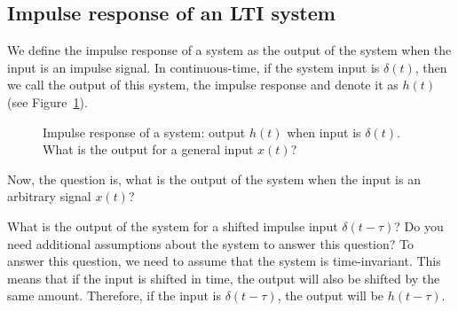 \documentclass{ee102_notes}
\begin{document}
\subsection{Impulse response of an LTI system}
We define the impulse response of a system as the output of the system when the input is an impulse signal. In continuous-time, if the system input is $\delta(t)$, then we call the output of this system, the impulse response and denote it as $h(t)$ (see Figure~\ref{fig:impulse-response}).
\begin{figure}[h]
\centering
{}
\caption{Impulse response of a system: output $h(t)$ when input is $\delta(t)$. What is the output for a general input $x(t)$?}
\label{fig:impulse-response}
\end{figure}
Now, the question is, what is the output of the system when the input is an arbitrary signal $x(t)$? 
\begin{popquiz}
    What is the output of the system for a shifted impulse input $\delta(t - \tau)$? Do you need additional assumptions about the system to answer this question?
    \popqsplit
    To answer this question, we need to assume that the system is time-invariant. This means that if the input is shifted in time, the output will also be shifted by the same amount. Therefore, if the input is $\delta(t - \tau)$, the output will be $h(t - \tau)$.
\end{popquiz}
\end{document}
